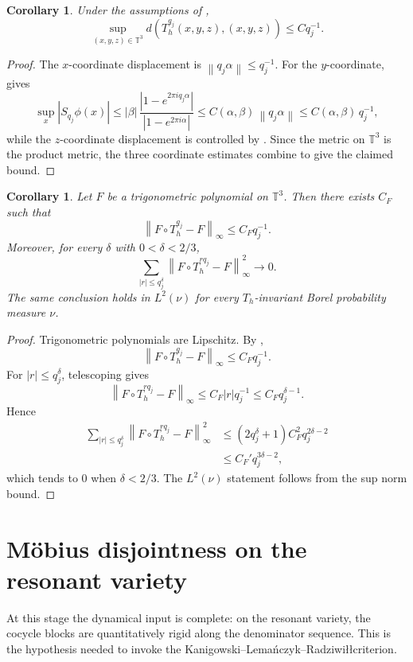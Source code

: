 \documentclass[11pt,reqno]{amsart}
\newtheorem{corollary}[theorem]{Corollary}
\theoremstyle{definition}
\newcommand{\T}{\mathbb{T}}
\newcommand{\e}[1]{e^{2\pi i #1}}
\newcommand{\norm}[1]{\left\lVert #1 \right\rVert}
\newcommand{\abs}[1]{\left\lvert #1 \right\rvert}
\newcommand{\qj}{q_j}
\begin{document}
\begin{corollary}\label{cor:uniform-rigidity}
Under the assumptions of ,
\[
\sup_{(x,y,z)\in \T^3} d(T_h^{\qj}(x,y,z),(x,y,z))
\le C \qj^{-1}.
\]
\end{corollary}

\begin{proof}
The $x$-coordinate displacement is $\norm{\qj\alpha}\le \qj^{-1}$. For the $y$-coordinate,
 gives
\[
\sup_x \abs{S_{\qj}\phi(x)}
\le
\abs{\beta}\,\frac{\abs{1-\e{\qj\alpha}}}{\abs{1-\e{\alpha}}}
\le
C(\alpha,\beta)\,\norm{\qj\alpha}
\le
C(\alpha,\beta)\,\qj^{-1},
\]
while the $z$-coordinate displacement is controlled by . Since the
metric on $\T^3$ is the product metric, the three coordinate estimates combine to give the
claimed bound.
\end{proof}

\begin{corollary}\label{cor:klr-condition}
Let $F$ be a trigonometric polynomial on $\T^3$. Then there exists $C_F$ such that
\[
\norm{F\circ T_h^{\qj}-F}_\infty
\le C_F \qj^{-1}.
\]
Moreover, for every $\delta$ with $0<\delta<2/3$,
\[
\sum_{\abs{r}\le \qj^\delta}
\norm{F\circ T_h^{r\qj}-F}_\infty^2 \to 0.
\]
The same conclusion holds in $L^2(\nu)$ for every $T_h$-invariant Borel probability measure
$\nu$.
\end{corollary}

\begin{proof}
Trigonometric polynomials are Lipschitz. By ,
\[
\norm{F\circ T_h^{\qj}-F}_\infty \le C_F \qj^{-1}.
\]
For $\abs{r}\le \qj^\delta$, telescoping gives
\[
\norm{F\circ T_h^{r\qj}-F}_\infty
\le C_F \abs{r}\qj^{-1}\le C_F \qj^{\delta-1}.
\]
Hence
\[
\begin{aligned}
\sum_{\abs{r}\le \qj^\delta}\norm{F\circ T_h^{r\qj}-F}_\infty^2
&\le
(2\qj^\delta+1) C_F^2 \qj^{2\delta-2}\\
&\le
C_F' \qj^{3\delta-2},
\end{aligned}
\]
which tends to $0$ when $\delta<2/3$. The $L^2(\nu)$ statement follows from the sup norm
bound.
\end{proof}

\section{M\"obius disjointness on the resonant variety}\label{sec:mobius}

At this stage the dynamical input is complete: on the resonant variety, the cocycle blocks are
quantitatively rigid along the denominator sequence. This is the hypothesis needed to
invoke the Kanigowski--Lema\'nczyk--Radziwi\l\l criterion.
\end{document}
